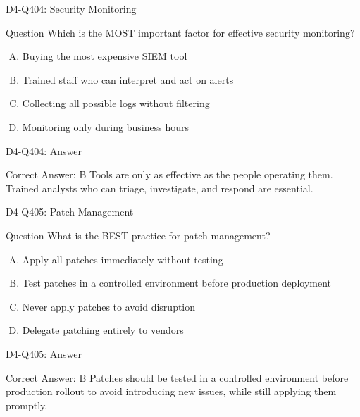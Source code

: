 \documentclass{beamer}
\begin{document}
\begin{frame}{D4-Q404: Security Monitoring}
	\begin{block}{Question}
		Which is the MOST important factor for effective security monitoring?
	\end{block}
	\begin{enumerate}[(A)]
		\item Buying the most expensive SIEM tool
		\item Trained staff who can interpret and act on alerts
		\item Collecting all possible logs without filtering
		\item Monitoring only during business hours
	\end{enumerate}
\end{frame}
\begin{frame}{D4-Q404: Answer}
	\begin{block}{Correct Answer: B}
		Tools are only as effective as the people operating them. Trained analysts who can triage, investigate, and respond are essential.
	\end{block}
\end{frame}

\begin{frame}{D4-Q405: Patch Management}
	\begin{block}{Question}
		What is the BEST practice for patch management?
	\end{block}
	\begin{enumerate}[(A)]
		\item Apply all patches immediately without testing
		\item Test patches in a controlled environment before production deployment
		\item Never apply patches to avoid disruption
		\item Delegate patching entirely to vendors
	\end{enumerate}
\end{frame}
\begin{frame}{D4-Q405: Answer}
	\begin{block}{Correct Answer: B}
		Patches should be tested in a controlled environment before production rollout to avoid introducing new issues, while still applying them promptly.
	\end{block}
\end{frame}
\end{document}
